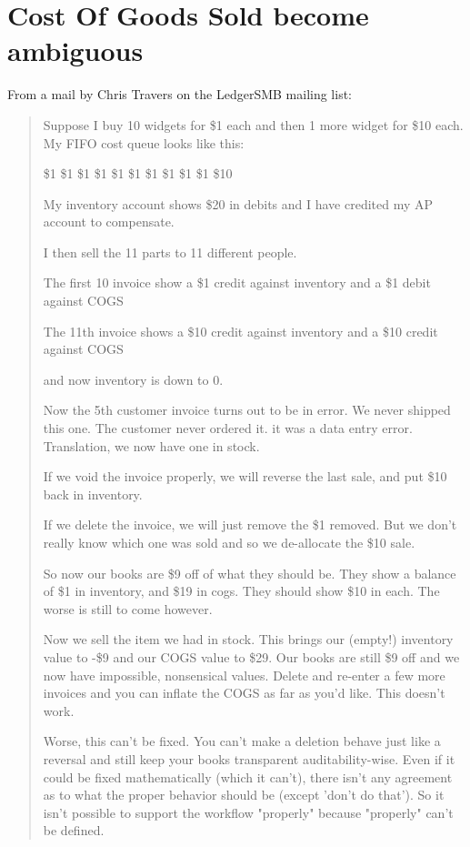 \section{Cost Of Goods Sold become ambiguous}
\label{sec-no-invoices-deletion-cogs-ambiguity}

From a mail by Chris Travers on the LedgerSMB mailing list:

\begin{quote}
Suppose I buy 10 widgets for \$1 each and then 1 more widget for \$10 each.  My FIFO cost queue looks like this:

\$1 \$1 \$1 \$1 \$1 \$1 \$1 \$1 \$1 \$1 \$10

My inventory account shows \$20 in debits and I have credited my AP account to compensate.

I then sell the 11 parts to 11 different people.

The first 10 invoice show a \$1 credit against inventory and a \$1 debit against COGS

The 11th invoice shows a \$10 credit against inventory and a \$10 credit against COGS 

and now inventory is down to 0.

Now the 5th customer invoice turns out to be in error. We never shipped this one. The customer never ordered it.  it was a data entry error.  Translation, we now have one in stock.

If we void the invoice properly, we will reverse the last sale, and put \$10 back in inventory. 

If we delete the invoice, we will just remove the \$1 removed.  But we don't really know which one was sold and so we de-allocate the \$10 sale.

So now our books are \$9 off of what they should be. They show a balance of \$1 in inventory, and \$19 in cogs. They should show \$10 in each.  The worse is still to come however.

Now we sell the item we had in stock.  This brings our (empty!) inventory value to -\$9 and our COGS value to \$29.  Our books are still \$9 off and we now have impossible, nonsensical values.  Delete and re-enter a few more invoices and you can inflate the COGS as far as you'd like.   This doesn't work.

Worse, this can't be fixed.  You can't make a deletion behave just like a reversal and still keep your books transparent auditability-wise.  Even if it could be fixed mathematically (which it can't), there isn't any agreement as to what the proper behavior should be (except 'don't do that').  So it isn't possible to support the workflow "properly" because "properly" can't be defined.


\end{quote}

